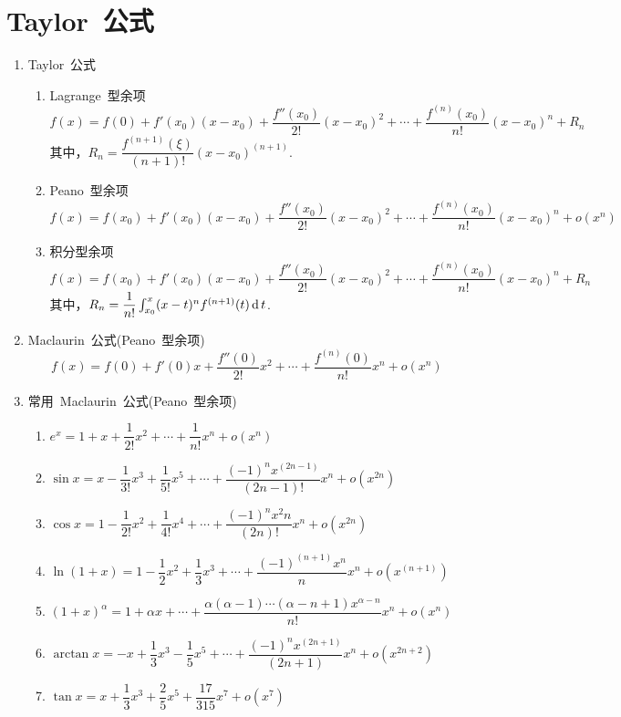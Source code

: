 \section{Taylor~公式}
  \begin{enumerate}[label=\arabic*., leftmargin=2em ]
  \item Taylor~公式
    \begin{enumerate}[label=(\arabic*)]
      \item Lagrange~型余项
      $$f(x)=f(0)+f'(x_0)(x-x_0)+\dfrac{f''(x_0)}{2\text{!}}(x-x_0)^2+\cdots+\dfrac{f^{(n)}(x_0)}{n\text{!}}(x-x_0)^n+R_n$$
      其中，$R_n=\dfrac{f^{(n+1)}(\xi)}{(n+1)\text{!}}(x-x_0)^{(n+1)}$.
      \item Peano~型余项
      $$f(x)=f(x_0)+f'(x_0)(x-x_0)+\dfrac{f''(x_0)}{2\text{!}}(x-x_0)^2+\cdots+\dfrac{f^{(n)}(x_0)}{n\text{!}}(x-x_0)^n+o(x^n)$$
      \item 积分型余项
      $$f(x)=f(x_0)+f'(x_0)(x-x_0)+\dfrac{f''(x_0)}{2\text{!}}(x-x_0)^2+\cdots+\dfrac{f^{(n)}(x_0)}{n\text{!}}(x-x_0)^n+R_n$$
      其中，$R_n=\dfrac{1}{n\text{!}} \int_{x_0}^x (x-t)^n f^{(n+1)}(t)\operatorname{\mathop{}\!\mathrm{d}} t$.
    \end{enumerate}
  \item Maclaurin~公式(Peano~型余项)
    $$f(x)=f(0)+f'(0)x+\dfrac{f''(0)}{2\text{!}}x^2+\cdots+\dfrac{f^{(n)}(0)}{n\text{!}}x^n+o(x^n)$$
  \item 常用~Maclaurin~公式(Peano~型余项)
    \begin{enumerate}[label=(\arabic*)]
      \item $e^x = 1+x+\dfrac{1}{2\text{!}}x^2+\cdots+\dfrac{1}{n\text{!}}x^n+o(x^n)$
      \item $\sin x = x-\dfrac{1}{3\text{!}}x^3+\dfrac{1}{5\text{!}}x^5+\cdots+\dfrac{(-1)^n x^(2n-1)}{(2n-1)\text{!}}x^n+o(x^{2n})$
      \item $\cos x = 1-\dfrac{1}{2\text{!}}x^2+\dfrac{1}{4\text{!}}x^4+\cdots+\dfrac{(-1)^n x^2n}{(2n)\text{!}}x^n+o(x^{2n})$
      \item $\ln (1+x) = 1-\dfrac{1}{2}x^2+\dfrac{1}{3}x^3+\cdots+\dfrac{(-1)^(n+1) x^n}{n}x^n+o(x^{(n+1)})$
      \item $(1+x)^\alpha = 1+\alpha x+\cdots+\dfrac{\alpha(\alpha-1)\cdots(\alpha-n+1)x^{\alpha-n}}{n\text{!}}x^n+o(x^n)$
      \item $\arctan x = -x+\dfrac{1}{3}x^3-\dfrac{1}{5}x^5+\cdots+\dfrac{(-1)^n x^(2n+1)}{(2n+1)}x^n+o(x^{2n+2})$
      \item $\tan x = x+\dfrac{1}{3}x^3+\dfrac{2}{5}x^5+\dfrac{17}{315}x^7+o(x^7)$
    \end{enumerate}
  \end{enumerate}

